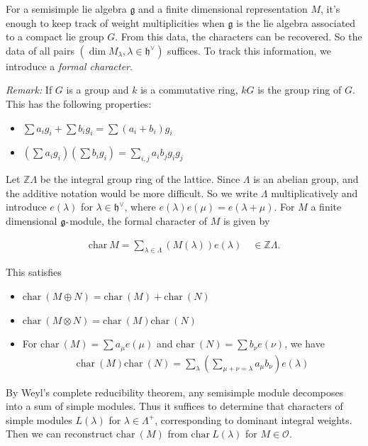 \documentclass[11pt]{scrartcl}
\theoremstyle{definition}
\theoremstyle{theorem}
\theoremstyle{proof}
\theoremstyle{definition}
\theoremstyle{break}
\theoremstyle{problem}
\providecommand{\tightlist}{%
  \setlength{\itemsep}{0pt}\setlength{\parskip}{0pt}}
\DeclarePairedDelimiter\qty{(}{)}
\renewcommand{\qty}[1]{{\left(  {#1} \right)}}
\newcommand{\ZZ}[0]{{\mathbb{Z}}}
\newcommand{\ch}[0]{\mathrm{char}~}
\newcommand{\dash}[0]{{\hbox{-}}}
\newcommand{\dual}[0]{^\vee}
\newcommand{\lieg}[0]{{\mathfrak{g}}}
\newcommand{\lieh}[0]{{\mathfrak{h}}}
\newcommand{\OO}[0]{{\mathcal{O}}}
\newcommand{\tensor}[0]{\otimes}
\begin{document}
For a semisimple lie algebra \(\lieg\) and a finite dimensional
representation \(M\), it's enough to keep track of weight multiplicities
when \(\lieg\) is the lie algebra associated to a compact lie group
\(G\). From this data, the characters can be recovered. So the data of
all pairs \((\dim M_\lambda, \lambda \in \lieh\dual)\) suffices. To
track this information, we introduce a \emph{formal character}.

\emph{Remark:} If \(G\) is a group and \(k\) is a commutative ring,
\(kG\) is the group ring of \(G\). This has the following properties:

\begin{itemize}
\tightlist
\item
  \(\sum a_i g_i + \sum b_i g_i = \sum(a_i + b_i) g_i\)
\item
  \(\qty{ \sum a_i g_i } \qty{ \sum b_i g_i } = \sum_{i, j} a_i b_j g_i g_j\)
\end{itemize}

Let \(\ZZ \Lambda\) be the integral group ring of the lattice. Since
\(\Lambda\) is an abelian group, and the additive notation would be more
difficult. So we write \(\Lambda\) multiplicatively and introduce
\(e(\lambda)\) for \(\lambda \in \lieh\dual\), where
\(e(\lambda) e(\mu) = e(\lambda + \mu)\). For \(M\) a finite dimensional
\(\lieg\dash\)module, the formal character of \(M\) is given by

\begin{align*}
\ch M = \sum_{\lambda\in \Lambda} \qty{ M(\lambda)  } e(\lambda) \quad\in \ZZ\Lambda
.\end{align*}

This satisfies

\begin{itemize}
\tightlist
\item
  \(\ch(M\oplus N) = \ch(M) + \ch(N)\)
\item
  \(\ch(M\tensor N) = \ch(M)\ch(N)\)
\item
  For \(\ch(M) = \sum a_\mu e(\mu)\) and \(\ch(N) = \sum b_\nu e(\nu)\),
  we have
  \begin{align*}\ch(M) \ch(N) = \sum_{\lambda} \qty{ \sum_{\mu + \nu = \lambda} a_\mu b_\nu } e(\lambda)\end{align*}
\end{itemize}

By Weyl's complete reducibility theorem, any semisimple module
decomposes into a sum of simple modules. Thus it suffices to determine
that characters of simple modules \(L(\lambda)\) for
\(\lambda \in \Lambda^+\), corresponding to dominant integral weights.
Then we can reconstruct \(\ch(M)\) from \(\ch L(\lambda)\) for
\(M\in \OO\).
\end{document}
